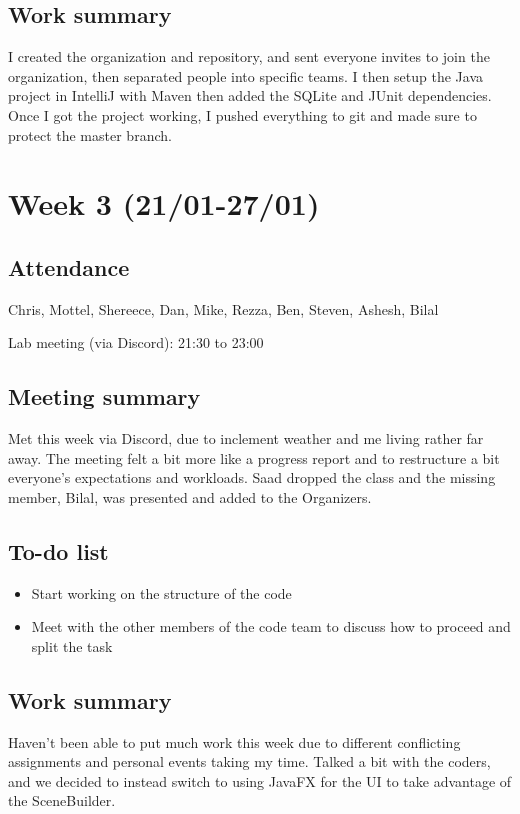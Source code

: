 \documentclass[letterpaper,10pt]{article}
\begin{document}
\subsection{Work summary}
I created the organization and repository, and sent everyone invites to join the organization, then separated people into specific teams. I then setup the Java project in IntelliJ with Maven then added the SQLite and JUnit dependencies. Once I got the project working, I pushed everything to git and made sure to protect the master branch.

\pagebreak


\section{Week 3 (21/01-27/01)}

\subsection{Attendance}
Chris, Mottel, Shereece, Dan, Mike, Rezza, Ben, Steven, Ashesh, Bilal

\noindent Lab meeting (via Discord): 21:30 to 23:00

\subsection{Meeting summary}
Met this week via Discord, due to inclement weather and me living rather far away. The meeting felt a bit more like a progress report and to restructure a bit everyone's expectations and workloads. Saad dropped the class and the missing member, Bilal, was presented and added to the Organizers.

\subsection{To-do list}
\begin{itemize}
\item Start working on the structure of the code
\item Meet with the other members of the code team to discuss how to proceed and split the task
\end{itemize}

\subsection{Work summary}
Haven't been able to put much work this week due to different conflicting assignments and personal events taking my time. Talked a bit with the coders, and we decided to instead switch to using JavaFX for the UI to take advantage of the SceneBuilder.
\end{document}
